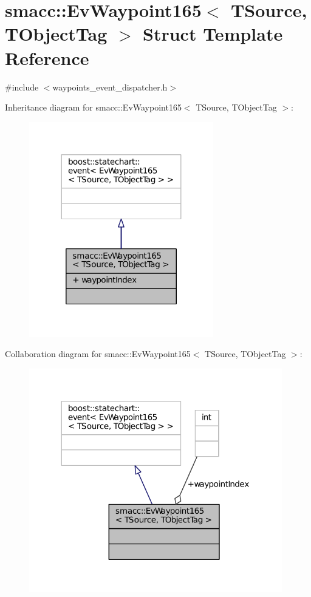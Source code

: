 \hypertarget{structsmacc_1_1EvWaypoint165}{}\section{smacc\+:\+:Ev\+Waypoint165$<$ T\+Source, T\+Object\+Tag $>$ Struct Template Reference}
\label{structsmacc_1_1EvWaypoint165}


{\ttfamily \#include $<$waypoints\+\_\+event\+\_\+dispatcher.\+h$>$}



Inheritance diagram for smacc\+:\+:Ev\+Waypoint165$<$ T\+Source, T\+Object\+Tag $>$\+:
\nopagebreak
\begin{figure}[H]
\begin{center}
\leavevmode
\includegraphics[width=227pt]{structsmacc_1_1EvWaypoint165__inherit__graph}
\end{center}
\end{figure}


Collaboration diagram for smacc\+:\+:Ev\+Waypoint165$<$ T\+Source, T\+Object\+Tag $>$\+:
\nopagebreak
\begin{figure}[H]
\begin{center}
\leavevmode
\includegraphics[width=312pt]{structsmacc_1_1EvWaypoint165__coll__graph}
\end{center}
\end{figure}
